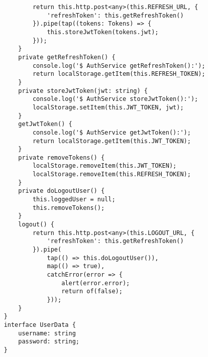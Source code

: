 \begin{lstlisting}
            return this.http.post<any>(this.REFRESH_URL, {
                'refreshToken': this.getRefreshToken()
            }).pipe(tap((tokens: Tokens) => {
                this.storeJwtToken(tokens.jwt);
            }));
        }
        private getRefreshToken() {
            console.log('$ AuthService getRefreshToken():');
            return localStorage.getItem(this.REFRESH_TOKEN);
        }
        private storeJwtToken(jwt: string) {
            console.log('$ AuthService storeJwtToken():');
            localStorage.setItem(this.JWT_TOKEN, jwt);
        }
        getJwtToken() {
            console.log('$ AuthService getJwtToken():');
            return localStorage.getItem(this.JWT_TOKEN);
        }
        private removeTokens() {
            localStorage.removeItem(this.JWT_TOKEN);
            localStorage.removeItem(this.REFRESH_TOKEN);
        }
        private doLogoutUser() {
            this.loggedUser = null;
            this.removeTokens();
        }
        logout() {
            return this.http.post<any>(this.LOGOUT_URL, {
                'refreshToken': this.getRefreshToken()
            }).pipe(
                tap(() => this.doLogoutUser()),
                map(() => true),
                catchError(error => {
                    alert(error.error);
                    return of(false);
                }));
        }
    }
    interface UserData {
        username: string
        password: string;
    }    
\end{lstlisting}
\clearpage